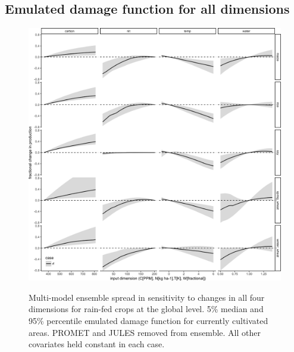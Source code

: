 \documentclass[10pt]{article}
\begin{document}
\subsection{Emulated damage function for all dimensions}
\begin{figure}[h!]
\includegraphics[width=\textwidth]{em_CTWN_all_crops.png}\\
\caption{Multi-model ensemble spread in sensitivity to changes in all four dimensions for rain-fed crops at the global level. 5\% median and 95\% percentile emulated damage function for currently cultivated areas. PROMET and JULES removed from ensemble. All other covariates held constant in each case.}
\label{fig:all_dims}
\end{figure}
\end{document}
